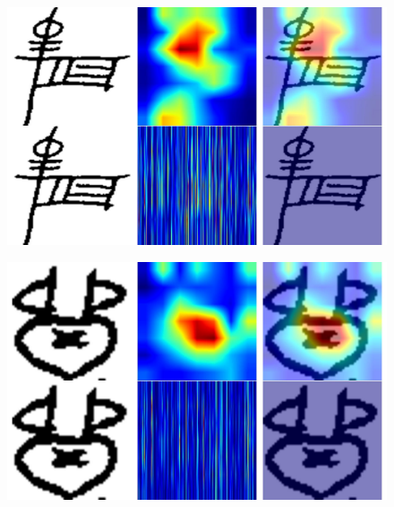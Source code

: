 \documentclass[11pt,a4paper,oneside]{report}
\begin{document}
 \begin{figure}[H]
    \centering
    \includegraphics[width=0.9\linewidth]{Visualizations/Grad-CAM/Old-Naxi/gradcam_19_class187_box1586_combined.pdf}
\end{figure}
 \begin{figure}[H]
    \centering
    \includegraphics[width=0.9\linewidth]{Visualizations/Grad-CAM/Old-Naxi/gradcam_24_class29_box2044_combined.pdf}
\end{figure}
\end{document}
